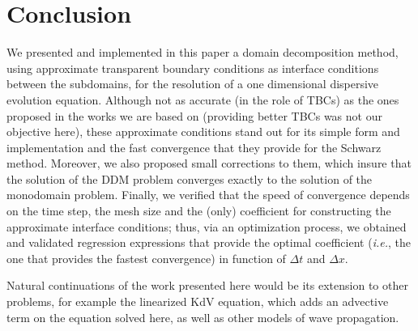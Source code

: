 \section{Conclusion}


\indent We presented and implemented in this paper a domain decomposition method, using approximate transparent boundary conditions as interface  conditions between the subdomains, for the resolution of a one dimensional dispersive evolution equation. Although not as accurate (in the role of TBCs) as the ones proposed in the works we are based on (providing better TBCs was not our objective here), these approximate conditions stand out for its simple form and implementation and the fast convergence that they provide for the Schwarz method. Moreover, we also proposed small corrections to them, which insure that the solution of the DDM problem converges exactly to the solution of the monodomain problem. Finally, we verified that the speed of convergence depends on the time step, the mesh size and the (only) coefficient for constructing the approximate interface conditions; thus, via an optimization process, we obtained and validated regression expressions that provide the optimal coefficient (\emph{i.e.}, the one that provides the fastest convergence) in function of $\Delta t $ and $\Delta x$.

\indent Natural continuations of the work presented here would be its extension to other problems, for example the linearized KdV equation, which adds an advective term on the equation solved here, as well as other models of wave propagation.